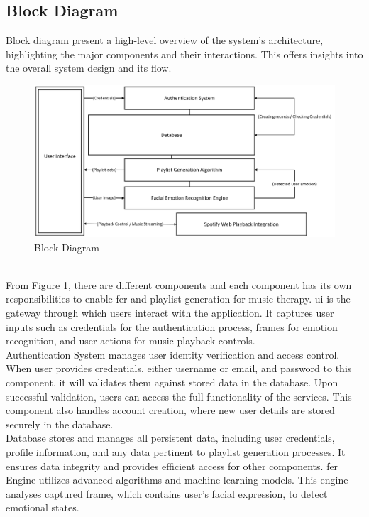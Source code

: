 \subsection{Block Diagram}
Block diagram present a high-level overview of the system's architecture, highlighting the major components and their interactions. \citep{freeman_block}
This offers insights into the overall system design and its flow.
\begin{figure}[!ht]
    \centering
    \includegraphics[width=12cm]{Images/block.png}
    \caption{Block Diagram}
    \label{fig:block}
\end{figure}
\\
\indent From Figure \ref{fig:block}, there are different components and each component has its own responsibilities to enable \gls{fer} and playlist generation for music therapy.
\gls{ui} is the gateway through which users interact with the application.
It captures user inputs such as credentials for the authentication process, frames for emotion recognition, and user actions for music playback controls.
\\
\indent Authentication System manages user identity verification and access control.
When user provides credentials, either username or email, and password to this component, it will validates them against stored data in the database. 
Upon successful validation, users can access the full functionality of the services.
This component also handles account creation, where new user details are stored securely in the database.
\\
\indent Database stores and manages all persistent data, including user credentials, profile information, and any data pertinent to playlist generation processes.
It ensures data integrity and provides efficient access for other components.
\gls{fer} Engine utilizes advanced algorithms and machine learning models.
This engine analyses captured frame, which contains user's facial expression, to detect emotional states.
